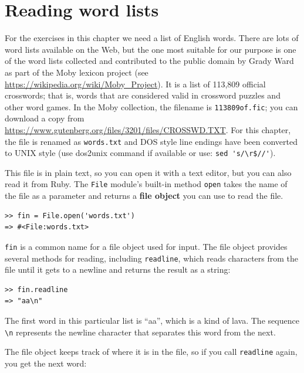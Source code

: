 \documentclass[10pt]{book}
\begin{document}
\section{Reading word lists}
\label{wordlist}

For the exercises in this chapter we need a list of English words.
There are lots of word lists available on the Web, but the one most
suitable for our purpose is one of the word lists collected and
contributed to the public domain by Grady Ward as part of the Moby
lexicon project (see \url{https://wikipedia.org/wiki/Moby_Project}).  It
is a list of 113,809 official crosswords; that is, words that are
considered valid in crossword puzzles and other word games.  In the
Moby collection, the filename is {\tt 113809of.fic}; you can download
a copy from \url{https://www.gutenberg.org/files/3201/files/CROSSWD.TXT}.
For this chapter, the file is renamed as {\tt words.txt} and DOS style
line endings have been converted to UNIX style (use dos2unix command
if available or use: \verb"sed 's/\r$//'").

This file is in plain text, so you can open it with a text
editor, but you can also read it from Ruby.  The {\tt File} module's built-in
method {\tt open} takes the name of the file as a parameter
and returns a {\bf file object} you can use to read the file.

\begin{verbatim}
>> fin = File.open('words.txt')
=> #<File:words.txt>
\end{verbatim}
%
{\tt fin} is a common name for a file object used for input.  The file
object provides several methods for reading, including {\tt readline},
which reads characters from the file until it gets to a newline and
returns the result as a string:

\begin{verbatim}
>> fin.readline
=> "aa\n"
\end{verbatim}
%
The first word in this particular list is ``aa'', which is a kind of
lava.  The sequence \verb"\n" represents the newline character that 
separates this word from the next.

The file object keeps track of where it is in the file, so
if you call {\tt readline} again, you get the next word:
\end{document}
